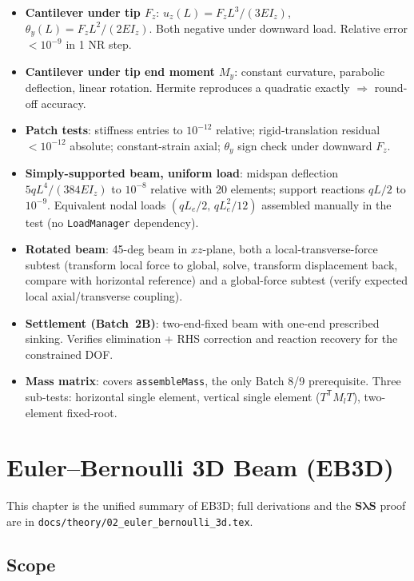 \documentclass[11pt,a4paper]{book}
\newcommand{\bmath}[1]{\boldsymbol{#1}}
\newcommand{\Sdiag}{\bmath{S}}
\newcommand{\lam}{\bmath{\lambda}}
\begin{document}
\begin{itemize}[leftmargin=*]
    \item \textbf{Cantilever under tip $F_z$}: $u_z(L) = F_z L^3/(3 E I_z)$, $\theta_y(L) = F_z L^2/(2 E I_z)$. Both negative under downward load. Relative error $< 10^{-9}$ in 1 NR step.
    \item \textbf{Cantilever under tip end moment $M_y$}: constant curvature, parabolic deflection, linear rotation. Hermite reproduces a quadratic exactly $\Rightarrow$ round-off accuracy.
    \item \textbf{Patch tests}: stiffness entries to $10^{-12}$ relative; rigid-translation residual $< 10^{-12}$ absolute; constant-strain axial; $\theta_y$ sign check under downward $F_z$.
    \item \textbf{Simply-supported beam, uniform load}: midspan deflection $5qL^4/(384 E I_z)$ to $10^{-8}$ relative with 20 elements; support reactions $qL/2$ to $10^{-9}$. Equivalent nodal loads $(qL_e/2,\,qL_e^2/12)$ assembled manually in the test (no \texttt{LoadManager} dependency).
    \item \textbf{Rotated beam}: 45-deg beam in $xz$-plane, both a local-transverse-force subtest (transform local force to global, solve, transform displacement back, compare with horizontal reference) and a global-force subtest (verify expected local axial/transverse coupling).
    \item \textbf{Settlement (Batch~2B)}: two-end-fixed beam with one-end prescribed sinking. Verifies elimination + RHS correction and reaction recovery for the constrained DOF.
    \item \textbf{Mass matrix}: covers \texttt{assembleMass}, the only Batch 8/9 prerequisite. Three sub-tests: horizontal single element, vertical single element ($T^\mathsf{T} M_l T$), two-element fixed-root.
\end{itemize}

\chapter{Euler--Bernoulli 3D Beam (EB3D)}\label{ch:eb3d}

This chapter is the unified summary of EB3D; full derivations and the $\Sdiag\lam\Sdiag$ proof are in \texttt{docs/theory/02\_euler\_bernoulli\_3d.tex}.

\section{Scope}
\end{document}
